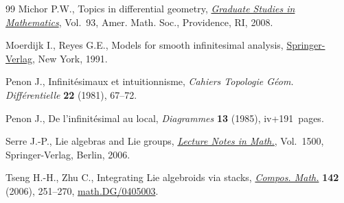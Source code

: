 \documentclass[pdftex]{sigma}
\numberwithin{equation}{section}
\begin{document}
\begin{thebibliography}{99}
Michor P.W., Topics in dif\/ferential geometry, \href{https://doi.org/10.1090/gsm/093}{\textit{Graduate Studies in
 Mathematics}}, Vol.~93, Amer. Math. Soc., Providence, RI, 2008.

Moerdijk I., Reyes G.E., Models for smooth inf\/initesimal analysis,
 \href{https://doi.org/10.1007/978-1-4757-4143-8}{Springer-Verlag}, New York, 1991.

Penon J., Inf\/init\'esimaux et intuitionnisme, \textit{Cahiers Topologie G\'eom.
 Diff\'erentielle} \textbf{22} (1981), 67--72.

Penon J., De l'inf\/init\'esimal au local, \textit{Diagrammes} \textbf{13}
 (1985), iv+191~pages.

Serre J.-P., Lie algebras and {L}ie groups, \href{https://doi.org/10.1007/978-3-540-70634-2}{\textit{Lecture Notes in Math.}},
 Vol.~1500, Springer-Verlag, Berlin, 2006.

Tseng H.-H., Zhu C., Integrating {L}ie algebroids via stacks, \href{https://doi.org/10.1112/S0010437X05001752}{\textit{Compos.
 Math.}} \textbf{142} (2006), 251--270, \href{http://arxiv.org/abs/math.DG/0405003}{math.DG/0405003}.

\end{thebibliography}\LastPageEnding
\end{document}
